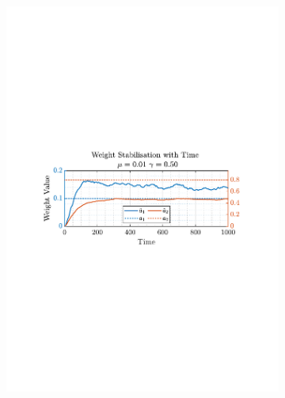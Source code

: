 \documentclass[12pt]{article}
\numberwithin{equation}{section}
\begin{document}
\begin{figure}[H]
\begin{subfigure}{0.49\textwidth}
					\includegraphics[trim={2.2cm 11.2cm 3.00cm  11.2cm}, clip, width=\textwidth]{../MATLAB/figures/q2_1f_fig05.pdf} 
					\captionsetup{justification=centering}
				\end{subfigure}
			

\end{figure}
\end{document}
